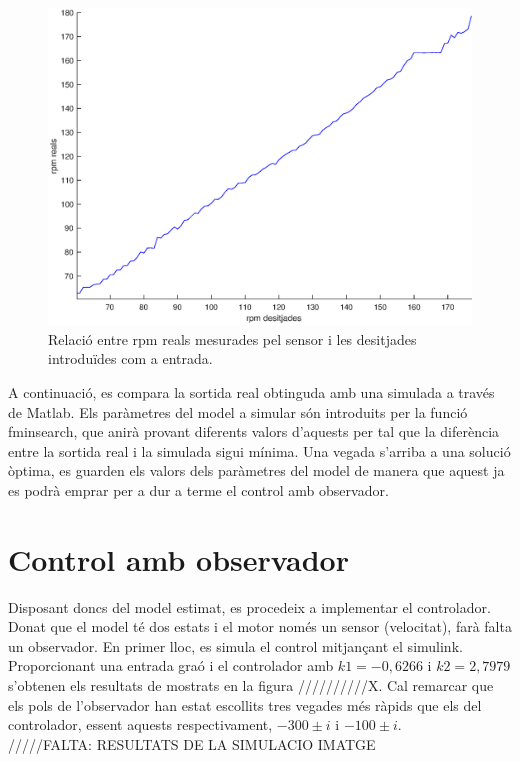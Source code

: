 \documentclass[]{article}
\begin{document}
\begin{figure}[H]
\centering
	\includegraphics[width = .8\linewidth]{images/rpmDes_rpmReal.eps}
	\caption{Relació entre rpm reals mesurades pel sensor i les desitjades introduïdes com a entrada.}
	\label{fig:rpmReal_rpmDes}
\end{figure}


 A continuació, es compara la sortida real obtinguda amb una simulada a través de Matlab. Els paràmetres del model a simular són introduits per la funció fminsearch, que anirà provant diferents valors d'aquests per tal que la diferència entre la sortida real i la simulada sigui mínima. Una vegada s'arriba a una solució òptima, es guarden els valors dels paràmetres del model de manera que aquest ja es podrà emprar per a dur a terme el control amb observador.

\section{Control amb observador}

Disposant doncs del model estimat, es procedeix a implementar el controlador. Donat que el model té dos estats i el motor només un sensor (velocitat), farà falta un observador. En primer lloc, es simula el control mitjançant el simulink. Proporcionant una entrada graó i el controlador amb $k1=-0,6266$ i $k2=2,7979$ s'obtenen els resultats de mostrats en la figura //////////X. Cal remarcar que els pols de l'observador han estat escollits tres vegades més ràpids que els del controlador, essent aquests respectivament,  $-300 \pm i$ i  $-100 \pm i$. \\

/////FALTA: RESULTATS DE LA SIMULACIO IMATGE \\
\end{document}
